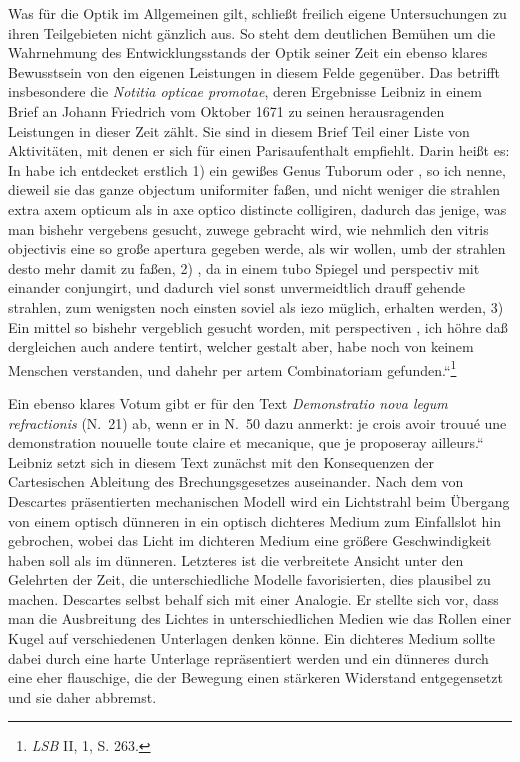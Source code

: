 Was f\"{u}r die Optik im Allgemeinen gilt, schlie{\ss}t freilich eigene Untersuchungen zu ihren Teilgebieten nicht g\"{a}nzlich aus. So steht dem deutlichen Bem\"{u}hen um die Wahrnehmung des Entwicklungsstands der Optik seiner Zeit ein ebenso klares Bewusstsein von den eigenen Leistungen in diesem Felde gegen\"{u}ber. Das betrifft insbesondere die \textit{Notitia opticae promotae}, deren Ergebnisse Leibniz in einem Brief an Johann Friedrich vom Oktober 1671 zu seinen herausragenden Leistungen in dieser Zeit z\"{a}hlt. Sie sind in diesem Brief Teil einer Liste von Aktivit\"{a}ten, mit denen er sich f\"{u}r einen Parisaufenthalt empfiehlt. Darin hei{\ss}t es: \glqq In  habe ich entdecket erstlich 1) ein gewi{\ss}es Genus Tuborum oder , so ich  nenne, dieweil sie das ganze objectum uniformiter fa{\ss}en, und nicht weniger die strahlen extra axem opticum als in axe optico distincte colligiren, dadurch das jenige, was man bishehr vergebens gesucht, zuwege gebracht wird, wie nehmlich den vitris objectivis eine so gro{\ss}e apertura gegeben werde, als wir wollen, umb der strahlen desto mehr damit zu fa{\ss}en, 2) , da in einem tubo Spiegel und perspectiv mit einander conjungirt, und dadurch viel sonst unvermeidtlich drauff gehende strahlen, zum wenigsten noch einsten soviel als iezo m\"{u}glich, erhalten werden, 3) Ein mittel so bishehr vergeblich gesucht worden, mit perspectiven , ich h\"{o}hre da{\ss} dergleichen auch andere tentirt, welcher gestalt aber, habe noch von keinem Menschen verstanden, und dahehr per artem Combinatoriam gefunden.``\footnote{\footnotesize \textit{LSB} II, 1, S. 263.}\par
\clearpage
Ein ebenso klares Votum gibt er f\"{u}r den Text \textit{Demonstratio nova legum refractionis} (N.~21) ab, wenn er in N.~50 dazu anmerkt: \glqq [...] je crois avoir trou\-u\'{e} une demonstration nouuelle toute claire et mecanique, que je proposeray ailleurs.``
Leibniz setzt sich in diesem Text zun\"{a}chst mit den Konsequenzen der Cartesischen Ableitung des Brechungsgesetzes auseinander. Nach dem von Des\-cartes pr\"{a}sentierten mechanischen Modell wird ein Lichtstrahl beim \"{U}bergang von einem optisch d\"{u}nneren in ein optisch dichteres Medium zum Einfallslot hin gebrochen, wobei das Licht im dichteren Medium eine gr\"{o}{\ss}ere Geschwindigkeit haben soll als im d\"{u}nneren. Letzteres ist die verbreitete Ansicht unter den Gelehrten der Zeit, die unterschiedliche Modelle favorisierten, dies plausibel zu machen. Descartes selbst behalf sich mit einer Analogie. Er stellte sich vor, dass man die Ausbreitung des Lichtes in unterschiedlichen Medien wie das Rollen einer Kugel auf verschiedenen Unterlagen denken k\"{o}nne. Ein dichteres Medium sollte dabei durch eine harte Unterlage repr\"{a}sentiert werden und ein d\"{u}nneres durch eine eher flauschige, die der Bewegung einen st\"{a}rkeren Widerstand entgegensetzt und sie daher abbremst.\par
